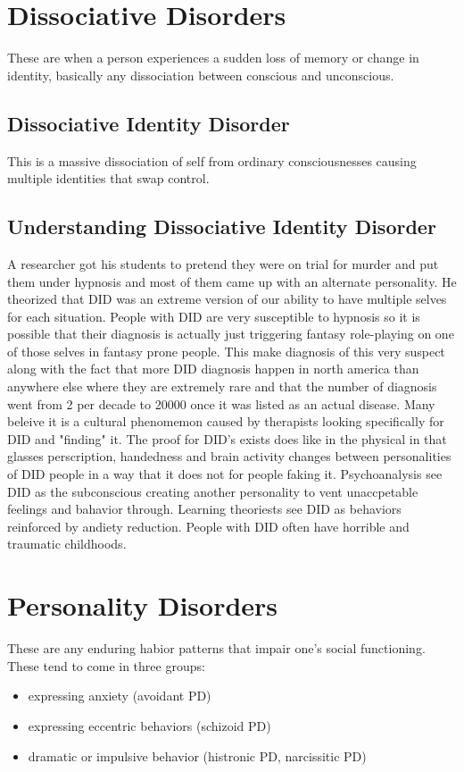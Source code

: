 \documentclass[12pt]{article}
\begin{document}
\section*{Dissociative Disorders}
These are when a person experiences a sudden loss of memory or change in identity, basically any dissociation between conscious and unconscious.
\subsection*{Dissociative Identity Disorder}
This is a massive dissociation of self from ordinary consciousnesses causing multiple identities that swap control. 
\subsection*{Understanding Dissociative Identity Disorder}
A researcher got his students to pretend they were on trial for murder and put them under hypnosis and most of them came up with an alternate personality. He theorized that DID was an extreme version of our ability to have multiple selves for each situation. People with DID are very susceptible to hypnosis so it is possible that their diagnosis is actually just triggering fantasy role-playing on one of those selves in fantasy prone people. This make diagnosis of this very suspect along with the fact that more DID diagnosis happen in north america than anywhere else where they are extremely rare and that the number of diagnosis went from 2 per decade to 20000 once it was listed as an actual disease. Many beleive it is a cultural phenomemon caused by therapists looking specifically for DID and "finding" it. The proof for DID's exists does like in the physical in that glasses perscription, handedness and brain activity changes between personalities of DID people in a way that it does not for people faking it. Psychoanalysis see DID as the subconscious creating another personality to vent unaccpetable feelings and bahavior through. Learning theoriests see DID as behaviors reinforced by andiety reduction. People with DID often have horrible and traumatic childhoods.
\section*{Personality Disorders}
These are any enduring habior patterns that impair one's social functioning. These tend to come in three groups:
\begin{itemize}
\item expressing anxiety (avoidant PD)
\item expressing eccentric behaviors (schizoid PD)
\item dramatic or impulsive behavior (histronic PD, narcissitic PD)
\end{itemize}
\end{document}
